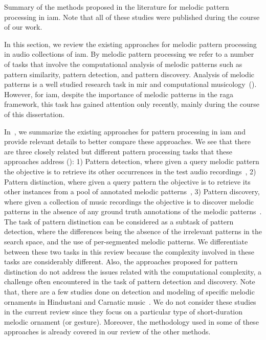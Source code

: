 \begin{table}
\begin{threeparttable}
\begin{tablenotes}
		\end{tablenotes}
		\caption[Summary of the melodic pattern processing methods for \gls{iam}]{Summary of the methods proposed in the literature for melodic pattern processing in \gls{iam}. Note that all of these studies were published during the course of our work.}
		\label{tab:pattern_processing_iam}
	\end{threeparttable}
\end{table}

In this section, we review the existing approaches for melodic pattern processing in audio collections of \gls{iam}. By melodic pattern processing we refer to a number of tasks that involve the computational analysis of melodic patterns such as pattern similarity, pattern detection, and pattern discovery. Analysis of melodic patterns is a well studied research task in \gls{mir} and computational musicology~(). However, for \gls{iam}, despite the importance of melodic patterns in the \gls{raga} framework, this task has gained attention only recently, mainly during the course of this dissertation. 

In~, we summarize the existing approaches for pattern processing in \gls{iam} and provide relevant details to better compare these approaches. We see that there are three closely related but different pattern processing tasks that these approaches address (): 1) Pattern detection, where given a query melodic pattern the objective is to retrieve its other occurrences in the test audio recordings~\citep{Ross2012,Ross2012b,Ishwar2013,dutta2014modified,ganguli2015efficient}, 2) Pattern distinction, where given a query pattern the objective is to retrieve its other instances from a pool of annotated melodic patterns~\citep{ishwar2012motivic,rao2013distinguishing,Rao2014}, 3) Pattern discovery, where given a collection of music recordings the objective is to discover melodic patterns in the absence of any ground truth annotations of the melodic patterns~\citep{Dutta2014}. The task of pattern distinction can be considered as a subtask of pattern detection, where the differences being the absence of the irrelevant patterns in the search space, and the use of per-segmented melodic patterns. We differentiate between these two tasks in this review because the complexity involved in these tasks are considerably different. Also, the approaches proposed for pattern distinction do not address the issues related with the computational complexity, a challenge often encountered in the task of pattern detection and discovery. Note that, there are a few studies done on detection and modeling of specific melodic ornaments in Hindustani and Carnatic music~\citep{Subramanian2012,Datta2007,narayan2014detection,pratyush_2010}. We do not consider these studies in the current review since they focus on a particular type of short-duration melodic ornament (or gesture). Moreover, the methodology used in some of these approaches is already covered in our review of the other methods.

